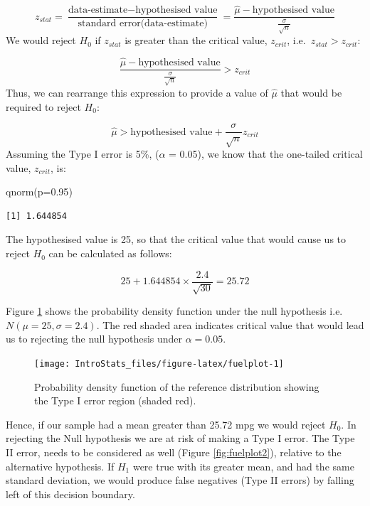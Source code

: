 \documentclass[
  oneside]{krantz}
\newenvironment{Shaded}{\begin{snugshade}}{\end{snugshade}}
\newcommand{\AttributeTok}[1]{\textcolor[rgb]{0.77,0.63,0.00}{#1}}
\newcommand{\FloatTok}[1]{\textcolor[rgb]{0.00,0.00,0.81}{#1}}
\newcommand{\FunctionTok}[1]{\textcolor[rgb]{0.00,0.00,0.00}{#1}}
\newcommand{\NormalTok}[1]{#1}
\begin{document}
\[ z_{stat} = \frac{\textrm{data-estimate} - \textrm{hypothesised value}}{\textrm{standard error(data-estimate)}} = \frac{\hat \mu - \textrm{hypothesised value}}{\frac{\sigma}{\sqrt{n}}}\]
We would reject \(H_0\) if \(z_{stat}\) is greater than the critical value, \(z_{crit}\), i.e.~\(z_{stat} > z_{crit}\):

\[ \frac{\hat \mu - \textrm{hypothesised value}}{\frac{\sigma}{\sqrt{n}}} > z_{crit}\]
Thus, we can rearrange this expression to provide a value of \(\hat \mu\) that would be required to reject \(H_0\):

\[\hat \mu > \textrm{hypothesised value} + \frac{\sigma}{\sqrt{n}}z_{crit}\]
Assuming the Type I error is 5\%, (\(\alpha\) = 0.05), we know that the one-tailed critical value, \(z_{crit}\), is:

\begin{Shaded}
\begin{Highlighting}[]
\FunctionTok{qnorm}\NormalTok{(}\AttributeTok{p=}\FloatTok{0.95}\NormalTok{)}
\end{Highlighting}
\end{Shaded}

\begin{verbatim}
[1] 1.644854
\end{verbatim}

The hypothesised value is 25, so that the critical value that would cause us to reject \(H_0\) can be calculated as follows:

\[25 + 1.644854 \times \frac{2.4}{\sqrt{30}} = 25.72\]

Figure \ref{fig:fuelplot} shows the probability density function under the null hypothesis i.e.~\(N(\mu=25, \sigma=2.4)\). The red shaded area indicates critical value that would lead us to rejecting the null hypothesis under \(\alpha = 0.05\).

\begin{figure}

{\centering \texttt{[image: IntroStats\_files/figure-latex/fuelplot-1]} 

}

\caption{Probability density function of the reference distribution showing the Type I error region (shaded red).}\label{fig:fuelplot}
\end{figure}

Hence, if our sample had a mean greater than 25.72 mpg we would reject \(H_0\). In rejecting the Null hypothesis we are at risk of making a Type I error. The Type II error, needs to be considered as well (Figure \ref{fig:fuelplot2}), relative to the alternative hypothesis. If \(H_1\) were true with its greater mean, and had the same standard deviation, we would produce false negatives (Type II errors) by falling left of this decision boundary.
\end{document}
